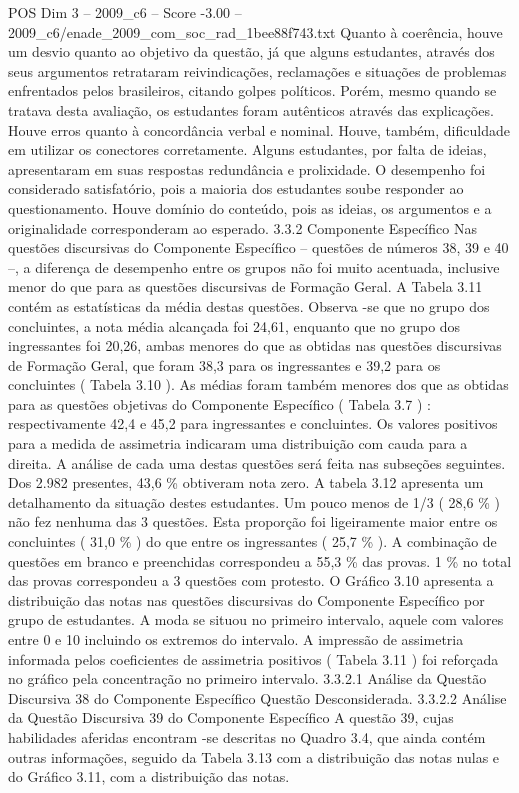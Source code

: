 \begin{textsample}{POS Dim 3 – 2009\_c6 – Score -3.00 – 2009\_c6/enade\_2009\_com\_soc\_rad\_1bee88f743.txt}
Quanto à coerência, houve um desvio quanto ao objetivo da questão, já que alguns estudantes, através dos seus argumentos retrataram reivindicações, reclamações e situações de problemas enfrentados pelos brasileiros, citando golpes políticos.
Porém, mesmo quando se tratava desta avaliação, os estudantes foram autênticos através das explicações.
Houve erros quanto à concordância verbal e nominal.
Houve, também, dificuldade em utilizar os conectores corretamente.
Alguns estudantes, por falta de ideias, apresentaram em suas respostas redundância e prolixidade.
O desempenho foi considerado satisfatório, pois a maioria dos estudantes soube responder ao questionamento.
Houve domínio do conteúdo, pois as ideias, os argumentos e a originalidade corresponderam ao esperado. 3.3.2 Componente Específico Nas questões discursivas do Componente Específico – questões de números 38, 39 e 40 –, a diferença de desempenho entre os grupos não foi muito acentuada, inclusive menor do que para as questões discursivas de Formação Geral.
A Tabela 3.11 contém as estatísticas da média destas questões.
Observa -se que no grupo dos concluintes, a nota média alcançada foi 24,61, enquanto que no grupo dos ingressantes foi 20,26, ambas menores do que as obtidas nas questões discursivas de Formação Geral, que foram 38,3 para os ingressantes e 39,2 para os concluintes ( Tabela 3.10 ).
As médias foram também menores dos que as obtidas para as questões objetivas do Componente Específico ( Tabela 3.7 ) : respectivamente 42,4 e 45,2 para ingressantes e concluintes.
Os valores positivos para a medida de assimetria indicaram uma distribuição com cauda para a direita.
A análise de cada uma destas questões será feita nas subseções seguintes.
Dos 2.982 presentes, 43,6 \% obtiveram nota zero.
A tabela 3.12 apresenta um detalhamento da situação destes estudantes.
Um pouco menos de 1/3 ( 28,6 \% ) não fez nenhuma das 3 questões.
Esta proporção foi ligeiramente maior entre os concluintes ( 31,0 \% ) do que entre os ingressantes ( 25,7 \% ).
A combinação de questões em branco e preenchidas correspondeu a 55,3 \% das provas. 1 \% no total das provas correspondeu a 3 questões com protesto.
O Gráfico 3.10 apresenta a distribuição das notas nas questões discursivas do Componente Específico por grupo de estudantes.
A moda se situou no primeiro intervalo, aquele com valores entre 0 e 10 incluindo os extremos do intervalo.
A impressão de assimetria informada pelos coeficientes de assimetria positivos ( Tabela 3.11 ) foi reforçada no gráfico pela concentração no primeiro intervalo. 3.3.2.1 Análise da Questão Discursiva 38 do Componente Específico Questão Desconsiderada. 3.3.2.2 Análise da Questão Discursiva 39 do Componente Específico A questão 39, cujas habilidades aferidas encontram -se descritas no Quadro 3.4, que ainda contém outras informações, seguido da Tabela 3.13 com a distribuição das notas nulas e do Gráfico 3.11, com a distribuição das notas.

\end{textsample}
